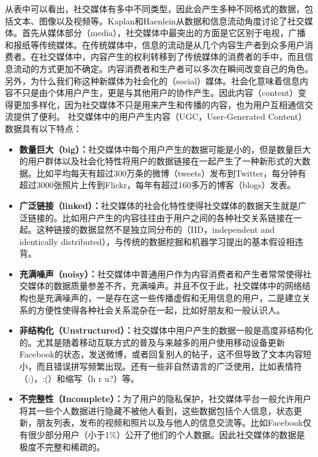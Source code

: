 从表中可以看出，社交媒体有多中不同类型，因此会产生多种不同格式的数据，包括文本、图像以及视频等。Kaplan和Haenlein从数据和信息流动角度讨论了社交媒体。首先从媒体部分（media），社交媒体中最突出的方面是它区别于电视，广播和报纸等传统媒体。在传统媒体中，信息的流动是从几个内容生产者到众多用户消费者。在社交媒体中，内容产生的权利转移到了传统媒体的消费者的手中，而且信息流动的方式更加不确定。内容消费者和生产者可以多次在瞬间改变自己的角色。另外，为什么我们称这种新媒体为社会化的（social）媒体。社会化意味着信息内容不只是由个体用户产生，更是与其他用户的协作产生。因此内容（content）变得更加多样化，因为社交媒体不只是用来产生和传播的内容，也为用户互相通信交流提供了便利。
社交媒体中的用户产生内容（UGC，User-Generated Content）数据具有以下特点：
\begin{itemize}
\item \textbf{数量巨大（big）：}社交媒体中每个用户产生的数据可能是小的，但是数量巨大的用户群体以及社会化特性将用户的数据链接在一起产生了一种新形式的大数据。比如平均每天有超过300万条的微博（tweets）发布到Twitter，每分钟有超过3000张照片上传到Flickr，每年有超过160多万的博客（blogs）发表。
\item \textbf{广泛链接（linked）：}社交媒体的社会化特性使得社交媒体的数据天生就是广泛链接的。比如用户产生的内容往往由于用户之间的各种社交关系链接在一起。这种链接的数据显然不是独立同分布的（IID，independent and identically distributed），与传统的数据挖掘和机器学习提出的基本假设相违背。
\item \textbf{充满噪声（noisy）：}社交媒体中普通用户作为内容消费者和产生者常常使得社交媒体的数据质量参差不齐，充满噪声。并且不仅于此，社交媒体中的网络结构也是充满噪声的，一是存在这一些传播虚假和无用信息的用户，二是建立关系的方便性使得各种社会关系混杂在一起，比如好朋友和一般认识人。
\item \textbf{非结构化（Unstructured）：}社交媒体中用户产生的数据一般是高度非结构化的。尤其是随着移动互联方式的普及与来越多的用户使用移动设备更新Facebook的状态，发送微博，或者回复别人的帖子，这不但导致了文本内容短小，而且错误拼写频繁出现。还有一些非自然语言的广泛使用，比如表情符（:)，:(）和缩写（h r u?）等。
\item \textbf{不完整性（Incomplete）：}为了用户的隐私保护，社交媒体平台一般允许用户将其一些个人数据进行隐藏不被他人看到，这些数据包括个人信息，状态更新，朋友列表，发布的视频和照片以及与他人的信息交流等。比如Facebook仅有很少部分用户（小于1\%）公开了他们的个人数据。因此社交媒体的数据是极度不完整和稀疏的。
\end{itemize}

